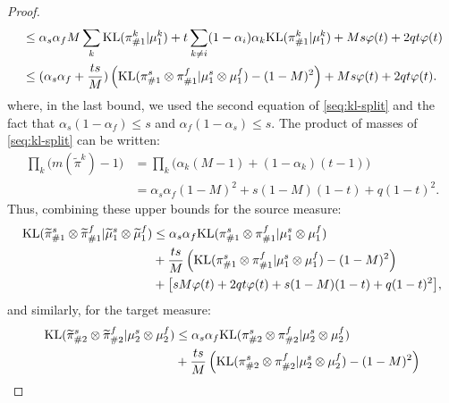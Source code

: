 \begin{proof}
\begin{equation}
\begin{split}
        &\leq \alpha_s\alpha_f M \sum_k \text{KL}(\pi^k_{\#1} \vert \mu^k_1) +
        t \sum_{k \neq i} (1-\alpha_i) \alpha_k \text{KL}(\pi^k_{\#1} \vert \mu^k_1)
        + M s \varphi(t)+ 2q t \varphi(t) \\
        &\leq (\alpha_s\alpha_f + \frac{t s}{M})\left(\text{KL}(\pi^s_{\#1} \otimes \pi^f_{\#1}
        \vert \mu^s_1 \otimes \mu^f_1) - (1-M)^2\right) + M s \varphi(t)+ 2q t \varphi(t).
        \end{split}
    \end{equation}
     where, in the last bound, we used the second equation of \eqref{seq:kl-split}
     and the fact that $\alpha_s(1-\alpha_f) \leq s$ and  $\alpha_f(1-\alpha_s) \leq s$.
     The product of masses of \eqref{seq:kl-split} can be written:
    \begin{equation}
      \begin{split}
        \prod_{k} \big( m(\widetilde{\pi}^k) - 1 \big) &= \prod_k \big( \alpha_k(M-1)
        + (1-\alpha_k)(t-1) \big) \\
        &= \alpha_s\alpha_f(1-M)^2 + s(1-M)(1-t) + q(1-t)^2.
      \end{split}
    \end{equation}
    Thus, combining these upper bounds for the source measure:
    \begin{equation}
      \begin{split}
        \text{KL}(\widetilde{\pi}^s_{\#1} \otimes \widetilde{\pi}^f_{\#1} \vert \widetilde{\mu}^s_1 \otimes \widetilde{\mu}^f_1)
        &\leq \alpha_s\alpha_f \text{KL}(\pi^s_{\#1} \otimes \pi^f_{\#1} \vert \mu^s_1 \otimes \mu^f_1) \\
        &+ \frac{ts}{M}\left(\text{KL}(\pi^s_{\#1} \otimes \pi^f_{\#1} \vert \mu^s_1 \otimes \mu^f_1) - (1-M)^2\right) \\
        &+ \big[  sM \varphi(t)+ 2q t \varphi(t) + s(1-M)(1-t) + q(1-t)^2 \big],
      \end{split}
    \end{equation}
    and similarly, for the target measure:
    \begin{equation}
      \begin{split}
        \kl(\widetilde{\pi}^s_{\#2} \otimes \widetilde{\pi}^f_{\#2} \vert \mu^s_2 \otimes \mu^f_2)
        &\leq \alpha_s\alpha_f \kl(\pi^s_{\#2} \otimes \pi^f_{\#2} \vert \mu^s_2 \otimes \mu^f_2) \\
        &+ \frac{ts}{M}\left(\kl(\pi^s_{\#2} \otimes \pi^f_{\#2} \vert \mu^s_2 \otimes \mu^f_2)
        - (1-M)^2\right) \\

\end{split}
\end{equation}
\end{proof}
